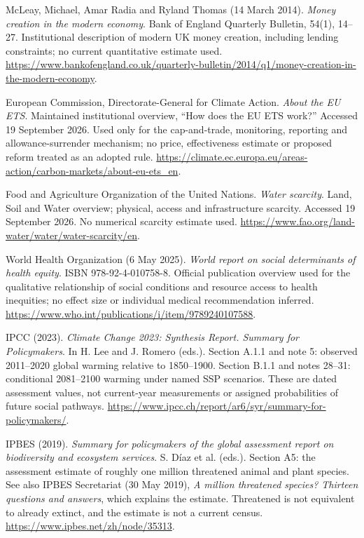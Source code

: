  McLeay, Michael, Amar Radia and Ryland Thomas (14 March 2014).
\textit{Money creation in the modern economy}. Bank of England Quarterly
Bulletin, 54(1), 14--27. Institutional description of modern UK money creation,
including lending constraints; no current quantitative estimate used.
\url{https://www.bankofengland.co.uk/quarterly-bulletin/2014/q1/money-creation-in-the-modern-economy}.

 European Commission, Directorate-General for Climate Action.
\textit{About the EU ETS}. Maintained institutional overview, ``How does the
EU ETS work?'' Accessed 19 September 2026. Used only for the cap-and-trade,
monitoring, reporting and allowance-surrender mechanism; no price, effectiveness
estimate or proposed reform treated as an adopted rule.
\url{https://climate.ec.europa.eu/areas-action/carbon-markets/about-eu-ets_en}.

 Food and Agriculture Organization of the United Nations.
\textit{Water scarcity}. Land, Soil and Water overview; physical, access and
infrastructure scarcity. Accessed 19 September 2026. No numerical scarcity
estimate used.
\url{https://www.fao.org/land-water/water/water-scarcity/en}.

 World Health Organization (6 May 2025).
\textit{World report on social determinants of health equity}.
ISBN 978-92-4-010758-8. Official publication overview used for the qualitative
relationship of social conditions and resource access to health inequities;
no effect size or individual medical recommendation inferred.
\url{https://www.who.int/publications/i/item/9789240107588}.

 IPCC (2023). \textit{Climate Change 2023: Synthesis Report.
Summary for Policymakers}. In H. Lee and J. Romero (eds.). Section A.1.1 and
note 5: observed 2011--2020 global warming relative to 1850--1900. Section
B.1.1 and notes 28--31: conditional 2081--2100 warming under named SSP
scenarios. These are dated assessment values, not current-year measurements
or assigned probabilities of future social pathways.
\url{https://www.ipcc.ch/report/ar6/syr/summary-for-policymakers/}.

 IPBES (2019). \textit{Summary for policymakers of the
global assessment report on biodiversity and ecosystem services}.
S. D\'iaz et al. (eds.). Section A5: the assessment estimate of roughly one
million threatened animal and plant species. See also IPBES Secretariat
(30 May 2019), \textit{A million threatened species? Thirteen questions and
answers}, which explains the estimate. Threatened is not equivalent to
already extinct, and the estimate is not a current census.
\url{https://www.ipbes.net/zh/node/35313}.

